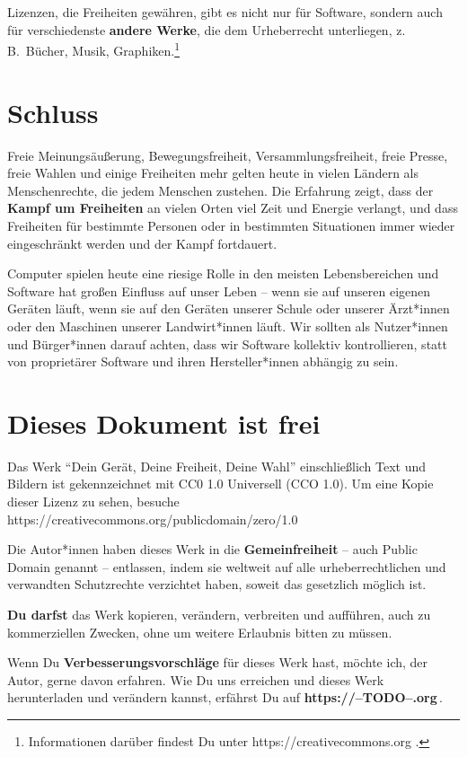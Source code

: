 \documentclass[a5paper,12pt]{scrartcl}
\begin{document}
Lizenzen, die Freiheiten gewähren, gibt es nicht nur für Software,
sondern auch für verschiedenste \textbf{andere Werke}, die dem
Urheberrecht unterliegen, z.\,B.\ Bücher, Musik,
Graphiken.\footnote{Informationen darüber findest Du unter
  https://creativecommons.org .}


\section{Schluss}

Freie Meinungsäußerung, Bewegungsfreiheit, Versammlungsfreiheit, freie
Presse, freie Wahlen und einige Freiheiten mehr gelten heute in vielen
Ländern als Menschenrechte, die jedem Menschen zustehen. Die Erfahrung
zeigt, dass der \textbf{Kampf um Freiheiten} an vielen Orten viel Zeit
und Energie verlangt, und dass Freiheiten für bestimmte Personen oder
in bestimmten Situationen immer wieder eingeschränkt werden und der
Kampf fortdauert.

Computer spielen heute eine riesige Rolle in den meisten
Lebensbereichen und Software hat großen Einfluss auf unser Leben --
wenn sie auf unseren eigenen Geräten läuft, wenn sie auf den Geräten
unserer Schule oder unserer Ärzt*innen oder den Maschinen unserer
Landwirt*innen läuft. Wir sollten als Nutzer*innen und Bürger*innen
darauf achten, dass wir Software kollektiv kontrollieren, statt von
proprietärer Software und ihren Hersteller*innen abhängig zu sein.


\section{Dieses Dokument ist frei}

Das Werk "`Dein Gerät, Deine Freiheit, Deine Wahl"' einschließlich
Text und Bildern ist gekennzeichnet mit CC0 1.0 Universell (CCO
1.0). Um eine Kopie dieser Lizenz zu sehen,
besuche\\
https://creativecommons.org/publicdomain/zero/1.0

Die Autor*innen haben dieses Werk in die \textbf{Gemeinfreiheit} --
auch Public Domain genannt -- entlassen, indem sie weltweit auf alle
urheberrechtlichen und verwandten Schutzrechte verzichtet haben,
soweit das gesetzlich möglich ist.

\textbf{Du darfst} das Werk kopieren, verändern, verbreiten und
aufführen, auch zu kommerziellen Zwecken, ohne um weitere Erlaubnis
bitten zu müssen.

Wenn Du \textbf{Verbesserungsvorschläge} für dieses Werk hast, möchte
ich, der Autor, gerne davon erfahren. Wie Du uns erreichen und dieses
Werk herunterladen und verändern kannst, erfährst Du auf
\textbf{https://--TODO--.org}\,.
\end{document}
